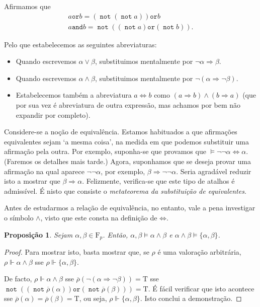 \documentclass{report}
\newtheorem{prop}{Proposição}
\theoremstyle{definition}
\theoremstyle{remark}
\newcommand{\F}{\mathrm{F}}
\newcommand{\lt}{\mathrm{T}}
\DeclareMathOperator{\pnot}{\texttt{not}}
\newcommand{\pand}{\mathbin{\texttt{and}}}
\newcommand{\por}{\mathbin{\texttt{or}}}
\newcommand{\imply}{\mathbin{\Rightarrow}}
\newcommand{\eqv}{\mathbin{\Leftrightarrow}}
\begin{document}
	Afirmamos que
	\begin{gather*}
	a \por b = (\pnot (\pnot a)) \por b\\
	a \pand b = \pnot ((\pnot a) \por (\pnot b)).
	\end{gather*}
	
	Pelo que estabelecemos as seguintes abreviaturas:
	
	\begin{itemize}
	\item Quando escrevemos $\alpha \lor \beta$, substituimos mentalmente por $\neg \alpha \imply \beta$.
	
	\item Quando escrevemos $\alpha \land \beta$, substituimos mentalmente por $\neg (\alpha \imply \neg \beta)$.
	
	\item Estabelecemos também a abreviatura $a \eqv b$ como $(a \imply b) \land (b \imply a)$ (que por sua vez é abreviatura de outra expressão, mas achamos por bem não expandir por completo).
	\end{itemize}
	
	Considere-se a noção de equivalência. Estamos habituados a que afirmações equivalentes sejam `a mesma coisa', na medida em que podemos substituir uma afirmação pela outra. Por exemplo, suponha-se que provamos que $\vDash \neg \neg \alpha \eqv \alpha$. (Faremos os detalhes mais tarde.) Agora, suponhamos que se deseja provar uma afirmação na qual aparece $\neg \neg \alpha$, por exemplo, $\beta \imply \neg \neg \alpha$. Seria agradável reduzir isto a mostrar que $\beta \imply \alpha$. Felizmente, verifica-se que este tipo de atalhos é admissível. É nisto que consiste o \emph{metateorema da substituição de equivalentes}.
	
	Antes de estudarmos a relação de equivalência, no entanto, vale a pena investigar o símbolo $\land$, visto que este consta na definição de $\eqv$.
	
	\begin{prop}\label{prop:conj:prop:sem}
	Sejam $\alpha, \beta \in \F_p$. Então, $\alpha, \beta \vDash \alpha \land \beta$ e $\alpha \land \beta \vDash \{\alpha, \beta\}$.
	\end{prop}
	
	\begin{proof}
	Para mostrar isto, basta mostrar que, se $\rho$ é uma valoração arbitrária, $\rho \Vdash \alpha \land \beta$ sse $\rho \Vdash \{\alpha, \beta\}$.
	
	De facto, $\rho \Vdash \alpha \land \beta$ sse $\overline\rho(\neg(\alpha \imply \neg \beta)) = \lt$ sse $\pnot ((\pnot \overline\rho(\alpha)) \por (\pnot \overline\rho(\beta))) = \lt$. É fácil verificar que isto acontece sse $\overline\rho(\alpha) = \overline\rho(\beta) = \lt$, ou seja, $\rho \Vdash \{\alpha, \beta\}$. Isto conclui a demonstração.
	\end{proof}
	
\end{document}

